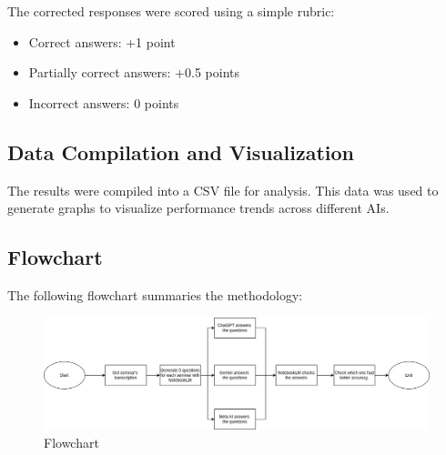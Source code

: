 The corrected responses were scored using a simple rubric:
\begin{itemize}
    \item Correct answers: +1 point
    \item Partially correct answers: +0.5 points
    \item Incorrect answers: 0 points
\end{itemize}

\subsection{Data Compilation and Visualization}
The results were compiled into a CSV file for analysis. This data was used to generate graphs to visualize performance trends across different AIs.
\subsection{Flowchart}
The following flowchart summaries the methodology:
\begin{figure}[H]
    \centering
    \includegraphics[scale=0.4]{Imagens/flowchart.jpg}
    \caption{Flowchart}
\end{figure}
\pagebreak